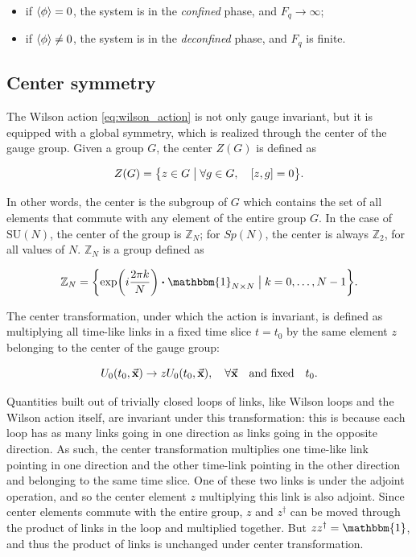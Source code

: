 \documentclass[reqno,12pt]{article}
\numberwithin{equation}{section}
\newcommand{\SU}{\mathrm{SU}}
\newcommand{\id}{\mathbbm{1}}
\begin{document}
\begin{itemize}
	\item if $\expval{\phi} = 0$, the system is in the \textit{confined} phase, and $F_q \rightarrow \infty$;
	\item if $\expval{\phi} \neq 0$, the system is in the \textit{deconfined} phase, and $F_q$ is finite.
\end{itemize}

\subsection{Center symmetry} \label{center}

The Wilson action \eqref{eq:wilson_action} is not only gauge invariant, but it is equipped with a global symmetry, which
is realized through the center of the gauge group. Given a group $G$, the center $Z(G)$ is defined as

\begin{equation}
	Z(G) = \qty{z \in G \bigm| \forall g \in G \qc [z, g] = 0}.
\end{equation}

In other words, the center is the subgroup of $G$ which contains the set of all elements that commute with any element of the
entire group $G$. In the case of $\SU(N)$, the center of the group is $\mathbb{Z}_N$; for $Sp(N)$, the center is always
$\mathbb{Z}_2$, for all values of $N$. $\mathbb{Z}_N$ is a group defined as

\begin{equation}
	\mathbb{Z}_N = \qty{\exp(i \frac{2\pi k}{N}) \vdot \id_{N\times N} \bigm| k = 0, \dots, N - 1 }.
\end{equation}

The center transformation, under which the action is invariant, is defined as multiplying all time-like links in 
a fixed time slice $t = t_0$ by the same element $z$ belonging to the center of the gauge group:

\begin{equation}
	U_0(t_0, \va{x}) \rightarrow z U_0(t_0, \va{x}) \qc \forall \va{x} \qq{and fixed} t_0.
\end{equation}

Quantities built out of trivially closed loops of links, like Wilson loops and the Wilson action itself, are invariant under this 
transformation: this is because each loop has as many links going in one direction as links going in the opposite direction.
As such, the center transformation multiplies one time-like link pointing in one direction and the other time-link pointing
in the other direction and belonging to the same time slice. One of these two links is under the adjoint operation, and so
the center element $z$ multiplying this link is also adjoint. Since center elements commute with the entire group, $z$ and
$z^\dagger$ can be moved through the product of links in the loop and multiplied together. But $z z^\dagger = \id$, 
and thus the product of links is unchanged under center transformation.   
\end{document}
